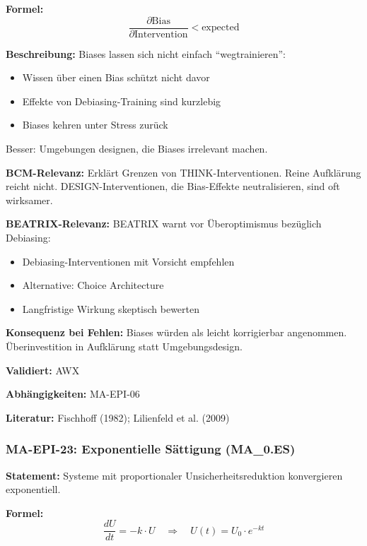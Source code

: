 \textbf{Formel:}
\begin{equation}
\frac{\partial \text{Bias}}{\partial \text{Intervention}} < \text{expected}
\end{equation}

\textbf{Beschreibung:}
Biases lassen sich nicht einfach ``wegtrainieren'':
\begin{itemize}
    \item Wissen über einen Bias schützt nicht davor
    \item Effekte von Debiasing-Training sind kurzlebig
    \item Biases kehren unter Stress zurück
\end{itemize}
Besser: Umgebungen designen, die Biases irrelevant machen.

\textbf{BCM-Relevanz:}
Erklärt Grenzen von THINK-Interventionen. Reine Aufklärung reicht nicht. DESIGN-Interventionen, die Bias-Effekte neutralisieren, sind oft wirksamer.

\textbf{BEATRIX-Relevanz:}
BEATRIX warnt vor Überoptimismus bezüglich Debiasing:
\begin{itemize}
    \item Debiasing-Interventionen mit Vorsicht empfehlen
    \item Alternative: Choice Architecture
    \item Langfristige Wirkung skeptisch bewerten
\end{itemize}

\textbf{Konsequenz bei Fehlen:}
Biases würden als leicht korrigierbar angenommen. Überinvestition in Aufklärung statt Umgebungsdesign.

\textbf{Validiert:} AWX

\textbf{Abhängigkeiten:} MA-EPI-06

\textbf{Literatur:} Fischhoff (1982); Lilienfeld et al. (2009)


\subsubsection*{MA-EPI-23: Exponentielle Sättigung (MA\_0.ES)}

\textbf{Statement:} Systeme mit proportionaler Unsicherheitsreduktion konvergieren exponentiell.

\textbf{Formel:}
\begin{equation}
\frac{dU}{dt} = -k \cdot U \quad \Rightarrow \quad U(t) = U_0 \cdot e^{-kt}
\end{equation}

